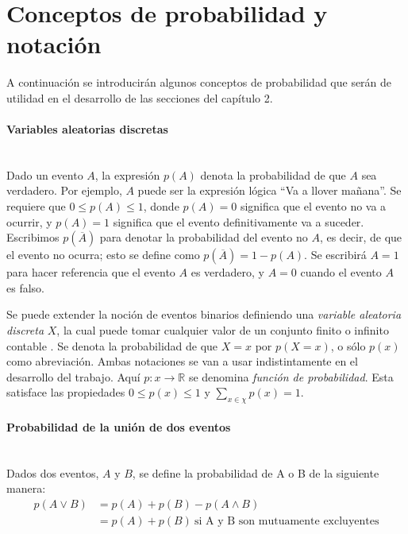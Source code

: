 \appendix
\section{Conceptos de probabilidad y notación}
\label{section:Apendice-A}

	A continuación se introducirán algunos conceptos de probabilidad que serán de utilidad en el desarrollo de las secciones del capítulo 2.

	\paragraph*{Variables aleatorias discretas} ~\\

		Dado un evento $A$, la expresión $p(A)$ denota la probabilidad de que $A$ sea verdadero. Por ejemplo, $A$ puede ser la expresión lógica ``Va a llover mañana''. Se requiere que $0 \leq p(A) \leq 1$, donde $p(A)=0$ significa que el evento no va a ocurrir, y $p(A)=1$ significa que el evento definitivamente va a suceder. Escribimos $p(\overline{A})$ para denotar la probabilidad del evento no $A$, es decir, de que el evento no ocurra; esto se define como $p(\overline{A})=1-p(A)$. Se escribirá $A=1$ para hacer referencia que el evento $A$ es verdadero, y $A=0$ cuando el evento $A$ es falso.
		
		Se puede extender la noción de eventos binarios definiendo una \textit{variable aleatoria discreta} $X$, la cual puede tomar cualquier valor de un conjunto finito o infinito contable \scalebox{1.4}{$\chi$}. Se denota la probabilidad de que $X=x$ por $p(X=x)$, o sólo $p(x)$ como abreviación. Ambas notaciones se van a usar indistintamente en el desarrollo del trabajo. Aquí $p: x \rightarrow \mathbb{R} $ se denomina \textit{función de probabilidad}. Esta satisface las propiedades $0 \leq p(x) \leq 1$ y $\sum_{x \in \chi}p(x)=1$.
		
	\paragraph*{Probabilidad de la unión de dos eventos} ~\\
		
		Dados dos eventos, $A$ y $B$, se define la probabilidad de A o B de la siguiente manera:
		\begin{align}
			p(A \lor B) &= p(A) + p(B) - p(A \land B) \\
			&= p(A) + p(B) ~\text{si A y B son mutuamente excluyentes}
		\end{align}
		
